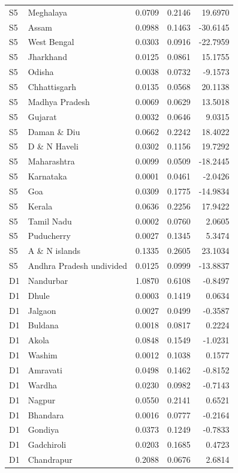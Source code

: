 \documentclass[11pt,a4paper]{report}
\begin{document}
\begin{longtable}{l>{\raggedright\arraybackslash}p{5cm}rrr}
S5 & Meghalaya & 0.0709 & 0.2146 & 19.6970 \\
S5 & Assam & 0.0988 & 0.1463 & -30.6145 \\
S5 & West Bengal & 0.0303 & 0.0916 & -22.7959 \\
S5 & Jharkhand & 0.0125 & 0.0861 & 15.1755 \\
S5 & Odisha & 0.0038 & 0.0732 & -9.1573 \\
S5 & Chhattisgarh & 0.0135 & 0.0568 & 20.1138 \\
S5 & Madhya Pradesh & 0.0069 & 0.0629 & 13.5018 \\
S5 & Gujarat & 0.0032 & 0.0646 & 9.0315 \\
S5 & Daman \& Diu & 0.0662 & 0.2242 & 18.4022 \\
S5 & D \& N Haveli & 0.0302 & 0.1156 & 19.7292 \\
S5 & Maharashtra & 0.0099 & 0.0509 & -18.2445 \\
S5 & Karnataka & 0.0001 & 0.0461 & -2.0426 \\
S5 & Goa & 0.0309 & 0.1775 & -14.9834 \\
S5 & Kerala & 0.0636 & 0.2256 & 17.9422 \\
S5 & Tamil Nadu & 0.0002 & 0.0760 & 2.0605 \\
S5 & Puducherry & 0.0027 & 0.1345 & 5.3474 \\
S5 & A \& N islands & 0.1335 & 0.2605 & 23.1034 \\
S5 & Andhra Pradesh undivided & 0.0125 & 0.0999 & -13.8837 \\
D1 & Nandurbar & 1.0870 & 0.6108 & -0.8497 \\
D1 & Dhule & 0.0003 & 0.1419 & 0.0634 \\
D1 & Jalgaon & 0.0027 & 0.0499 & -0.3587 \\
D1 & Buldana & 0.0018 & 0.0817 & 0.2224 \\
D1 & Akola & 0.0848 & 0.1549 & -1.0231 \\
D1 & Washim & 0.0012 & 0.1038 & 0.1577 \\
D1 & Amravati & 0.0498 & 0.1462 & -0.8152 \\
D1 & Wardha & 0.0230 & 0.0982 & -0.7143 \\
D1 & Nagpur & 0.0550 & 0.2141 & 0.6521 \\
D1 & Bhandara & 0.0016 & 0.0777 & -0.2164 \\
D1 & Gondiya & 0.0373 & 0.1249 & -0.7833 \\
D1 & Gadchiroli & 0.0203 & 0.1685 & 0.4723 \\
D1 & Chandrapur & 0.2088 & 0.0676 & 2.6814 \\

\end{longtable}
\end{document}
